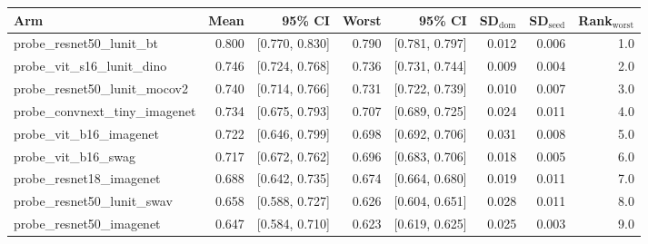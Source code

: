 \begin{tabular}{lrrrrrrr}
\toprule
Arm & Mean & 95\% CI & Worst & 95\% CI & SD$_\text{dom}$ & SD$_\text{seed}$ & Rank$_\text{worst}$ \\
\midrule
probe\_resnet50\_lunit\_bt & 0.800 & [0.770, 0.830] & 0.790 & [0.781, 0.797] & 0.012 & 0.006 & 1.0 \\
probe\_vit\_s16\_lunit\_dino & 0.746 & [0.724, 0.768] & 0.736 & [0.731, 0.744] & 0.009 & 0.004 & 2.0 \\
probe\_resnet50\_lunit\_mocov2 & 0.740 & [0.714, 0.766] & 0.731 & [0.722, 0.739] & 0.010 & 0.007 & 3.0 \\
probe\_convnext\_tiny\_imagenet & 0.734 & [0.675, 0.793] & 0.707 & [0.689, 0.725] & 0.024 & 0.011 & 4.0 \\
probe\_vit\_b16\_imagenet & 0.722 & [0.646, 0.799] & 0.698 & [0.692, 0.706] & 0.031 & 0.008 & 5.0 \\
probe\_vit\_b16\_swag & 0.717 & [0.672, 0.762] & 0.696 & [0.683, 0.706] & 0.018 & 0.005 & 6.0 \\
probe\_resnet18\_imagenet & 0.688 & [0.642, 0.735] & 0.674 & [0.664, 0.680] & 0.019 & 0.011 & 7.0 \\
probe\_resnet50\_lunit\_swav & 0.658 & [0.588, 0.727] & 0.626 & [0.604, 0.651] & 0.028 & 0.011 & 8.0 \\
probe\_resnet50\_imagenet & 0.647 & [0.584, 0.710] & 0.623 & [0.619, 0.625] & 0.025 & 0.003 & 9.0 \\
\bottomrule
\end{tabular}
